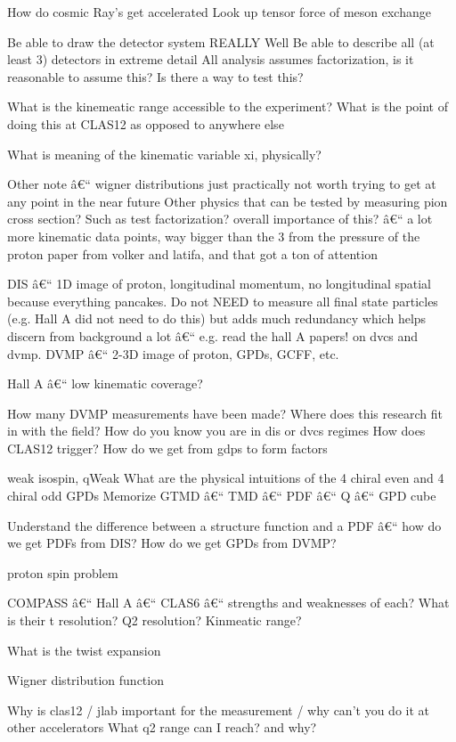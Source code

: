 How do cosmic Ray's get accelerated
Look up tensor force of meson exchange



Be able to draw the detector system REALLY Well
Be able to describe all (at least 3) detectors in extreme detail 
All analysis assumes factorization, is it reasonable to assume this? Is there a way to test this?

What is the kinemeatic range accessible to the experiment?
What is the point of doing this at CLAS12 as opposed to anywhere else

What is meaning of the kinematic variable xi, physically?


Other note â€“ wigner distributions just practically not worth trying to get at any point in the near future
Other physics that can be tested by measuring pion cross section? Such as test factorization? 
overall importance of this? â€“ a lot more kinematic data points, way bigger than the 3 from the pressure of the proton paper from volker and latifa, and that got a ton of attention

DIS â€“ 1D image of proton, longitudinal momentum, no longitudinal spatial because everything pancakes.
Do not NEED to measure all final state particles (e.g. Hall A did not need to do this) but adds much redundancy which helps discern from background a lot â€“ e.g. read the hall A papers! on dvcs and dvmp.
DVMP â€“ 2-3D image of proton, GPDs, GCFF, etc.

Hall A â€“ low kinematic coverage?

How many DVMP measurements have been made? Where does this research fit in with the field? 
How do you know you are in dis or dvcs regimes
How does CLAS12 trigger?
How do we get from gdps to form factors


weak isospin, qWeak
What are the physical intuitions of the 4 chiral even and 4 chiral odd GPDs
Memorize GTMD â€“ TMD â€“ PDF â€“ Q â€“ GPD cube

Understand the difference between a structure function and a PDF â€“ how do we get PDFs from DIS? How do we get GPDs from DVMP?

proton spin problem

COMPASS â€“ Hall A â€“ CLAS6 â€“ strengths and weaknesses of each? What is their t resolution? Q2 resolution? Kinmeatic range?

What is the twist expansion

Wigner distribution function

Why is clas12 / jlab important for the measurement / why can't you do it at other accelerators
What q2 range can I reach? and why?

